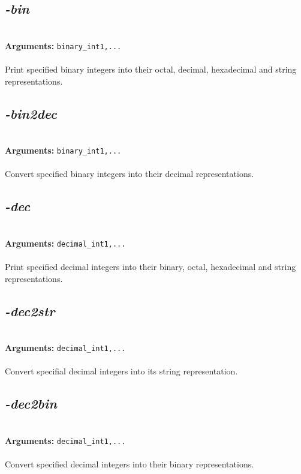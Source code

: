 \documentclass[a4paper,11pt,twoside]{book}
\begin{document}
\subsection{\emph{-bin} }\vspace*{-0.5em}
~\\\textbf{Arguments: } 
{\small \texttt{binary\_int1,...}}\\~\\
Print specified binary integers into their octal, decimal, hexadecimal and string representations.


\subsection{\emph{-bin2dec} }\vspace*{-0.5em}
~\\\textbf{Arguments: } 
{\small \texttt{binary\_int1,...}}\\~\\
Convert specified binary integers into their decimal representations.


\subsection{\emph{-dec} }\vspace*{-0.5em}
~\\\textbf{Arguments: } 
{\small \texttt{decimal\_int1,...}}\\~\\
Print specified decimal integers into their binary, octal, hexadecimal and string representations.


\subsection{\emph{-dec2str} }\vspace*{-0.5em}
~\\\textbf{Arguments: } 
{\small \texttt{decimal\_int1,...}}\\~\\
Convert specifial decimal integers into its string representation.


\subsection{\emph{-dec2bin} }\vspace*{-0.5em}
~\\\textbf{Arguments: } 
{\small \texttt{decimal\_int1,...}}\\~\\
Convert specified decimal integers into their binary representations.
\end{document}
